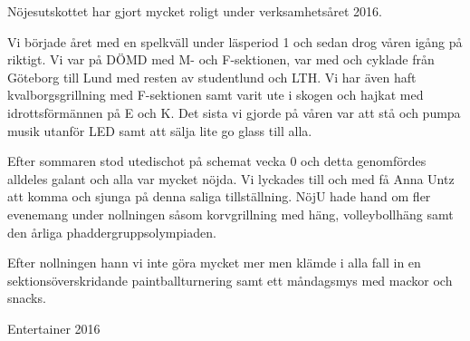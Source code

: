 \documentclass[../_main/handlingar.tex]{subfiles}
\begin{document}
Nöjesutskottet har gjort mycket roligt under verksamhetsåret 2016.

Vi började året med en spelkväll under läsperiod 1 och sedan drog våren igång på riktigt. Vi var på DÖMD med M- och F-sektionen, var med och cyklade från Göteborg till Lund med resten av studentlund och LTH. Vi har även haft kvalborgsgrillning med F-sektionen samt varit ute i skogen och hajkat med idrottsförmännen på E och K. Det sista vi gjorde på våren var att stå och pumpa musik utanför LED samt att sälja lite go glass till alla.

Efter sommaren stod utedischot på schemat vecka 0 och detta genomfördes alldeles galant och alla var mycket nöjda. Vi lyckades till och med få Anna Untz att komma och sjunga på denna saliga tillställning. NöjU hade hand om fler evenemang under nollningen såsom korvgrillning med häng, volleybollhäng samt den årliga phaddergruppsolympiaden.

Efter nollningen hann vi inte göra mycket mer men klämde i alla fall in en sektionsöverskridande paintballturnering samt ett måndagsmys med mackor och snacks.
\begin{signatures}{1}
    \mvh
    \signature{Dalia Khairallah}{Entertainer 2016}
\end{signatures}
\end{document}

